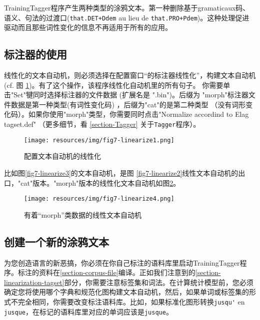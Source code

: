 \bigskip
\noindent 
 TrainingTagger程序产生两种类型的涂鸦文本。第一种删除基于gramaticaux码、语义、句法的过渡口(\verb$that.DET+Ddem$ au lieu de \verb$that.PRO+Pdem$)。这种处理促进驱动而且那些词性变化的信息不再适用于所有的应用。


\subsection{标注器的使用}

线性化的文本自动机，则必须选择在配置窗口“的标注器线性化”，构建文本自动机(cf. 图 \ref{fig7-linearize1})。有了这个操作，该程序线性化自动机里的所有句子。 你需要单击"Set"犍同时选择标注器的文件数据 (扩展名是 ".bin")。后缀为 "morph"标注器文件数据是第一种类型(有词性变化码) ，后缀为"cat"的是第二种类型 （没有词形变化码）。如果你使用"morph"类型，你需要同时点击"Normalize accordind to Elag
tagset.def" （更多细节，看 \ref{section-Tagger} 关于\verb+Tagger+程序）。

\begin{figure}[!ht]
\begin{center}
\texttt{[image: resources/img/fig7-linearize1.png]}
\caption{配置文本自动机的线性化\label{fig7-linearize1}}
\end{center}
\end{figure}

\bigskip
\noindent 
比如图\ref{fig7-linearize3}的文本自动机，是图 \ref{fig7-linearize2}线性文本自动机的出口，"cat"版本。"morph"版本的线性化文本自动机如图\ref{fig7-linearize4}。

\begin{figure}[!ht]
\begin{center}
\texttt{[image: resources/img/fig7-linearize4.png]}
\caption{有着“morph”类数据的线性文本自动机\label{fig7-linearize4}}
\end{center}
\end{figure}

\subsection{创建一个新的涂鸦文本}
为您创造语言的新恶搞，你必须在你自己标注的语料库里启动TrainingTagger程序。标注的资料在\ref{section-corpus-file}编译。正如我们注意到的\ref{section-linearization-tagset}部分，你需要注意标签集和词法。在计算统计模型前，您必须确定您将使用哪个字典和规范化图构建文本自动机，然后，如果单词或标签集的形式不完全相同，你需要改变标注语料库。比如，如果标准化图形转换\verb+jusqu'+ en \verb+jusque+，在标记的语料库里对应的单词应该是\verb+jusque+。

